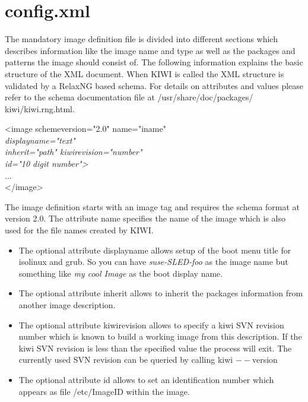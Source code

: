 \section{config.xml}
The mandatory image definition file is divided into different sections
which describes information like the image name and type as well as
the packages and patterns the image should consist of. The following
information explains the basic structure of the XML document. When KIWI
is called the XML structure is validated by a RelaxNG based schema.
For details on attributes and values please refer to the schema 
documentation file at /usr/share/doc/packages/ kiwi/kiwi.rng.html.

\begin{Command}{12cm}
<image schemeversion="2.0" name="iname"\\
\hspace*{1.9cm}\textit{displayname="text"}\\
\hspace*{1.9cm}\textit{inherit="path" kiwirevision="number"}\\
\hspace*{1.9cm}\textit{id="10 digit number">}\\
\hspace*{1cm}...\\
</image>
\end{Command}

The image definition starts with an image tag and requires the
schema format at version 2.0. The attribute name specifies the
name of the image which is also used for the file names created
by KIWI.

\begin{itemize}
\item The optional attribute displayname allows setup of the boot
      menu title for isolinux and grub. So you can have
      \textit{suse-SLED-foo} as the image name but something like
      \textit{my cool Image} as the boot display name.
\item The optional attribute inherit allows to inherit the
      packages information from another image description.
\item The optional attribute kiwirevision allows to specify
      a kiwi SVN revision number which is known to build
      a working image from this description. If the kiwi SVN
      revision is less than the specified value the
      process will exit. The currently used SVN revision can
      be queried by calling kiwi $--$version
\item The optional attribute id allows to set an identification
      number which appears as file /etc/ImageID within the
      image.
\end{itemize}

